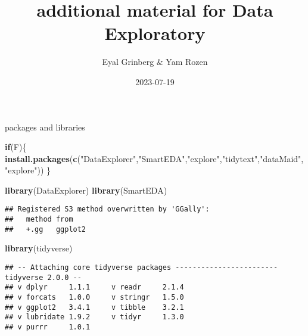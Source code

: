 \documentclass[
]{article}
\title{additional material for Data Exploratory}
\author{Eyal Grinberg \& Yam Rozen}
\date{2023-07-19}
\newenvironment{Shaded}{\begin{snugshade}}{\end{snugshade}}
\newcommand{\AttributeTok}[1]{\textcolor[rgb]{0.13,0.29,0.53}{#1}}
\newcommand{\ControlFlowTok}[1]{\textcolor[rgb]{0.13,0.29,0.53}{\textbf{#1}}}
\newcommand{\DecValTok}[1]{\textcolor[rgb]{0.00,0.00,0.81}{#1}}
\newcommand{\FunctionTok}[1]{\textcolor[rgb]{0.13,0.29,0.53}{\textbf{#1}}}
\newcommand{\NormalTok}[1]{#1}
\newcommand{\SpecialCharTok}[1]{\textcolor[rgb]{0.81,0.36,0.00}{\textbf{#1}}}
\newcommand{\StringTok}[1]{\textcolor[rgb]{0.31,0.60,0.02}{#1}}
\begin{document}
\maketitle

\begin{Shaded}
\end{Shaded}

packages and libraries

\begin{Shaded}
\begin{Highlighting}[]
\ControlFlowTok{if}\NormalTok{(F)\{}
  \FunctionTok{install.packages}\NormalTok{(}\FunctionTok{c}\NormalTok{(}\StringTok{"DataExplorer"}\NormalTok{,}\StringTok{"SmartEDA"}\NormalTok{,}\StringTok{"explore"}\NormalTok{,}\StringTok{"tidytext"}\NormalTok{,}\StringTok{"dataMaid"}\NormalTok{, }\StringTok{"explore"}\NormalTok{))}
\NormalTok{\}}
\end{Highlighting}
\end{Shaded}

\begin{Shaded}
\begin{Highlighting}[]
\FunctionTok{library}\NormalTok{(DataExplorer)}
\FunctionTok{library}\NormalTok{(SmartEDA)}
\end{Highlighting}
\end{Shaded}

\begin{verbatim}
## Registered S3 method overwritten by 'GGally':
##   method from   
##   +.gg   ggplot2
\end{verbatim}

\begin{Shaded}
\begin{Highlighting}[]
\FunctionTok{library}\NormalTok{(tidyverse)}
\end{Highlighting}
\end{Shaded}

\begin{verbatim}
## -- Attaching core tidyverse packages ------------------------ tidyverse 2.0.0 --
## v dplyr     1.1.1     v readr     2.1.4
## v forcats   1.0.0     v stringr   1.5.0
## v ggplot2   3.4.1     v tibble    3.2.1
## v lubridate 1.9.2     v tidyr     1.3.0
## v purrr     1.0.1
\end{verbatim}
\end{document}
